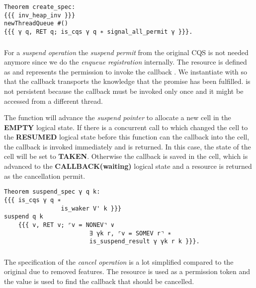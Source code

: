 \begin{verbatim}
Theorem create_spec:
{{{ inv_heap_inv }}}
newThreadQueue #()
{{{ γ q, RET q; is_cqs γ q ∗ signal_all_permit γ }}}.
\end{verbatim}

\subsubsection{}
\label{sec:cqs-spec-suspend}

For a \textit{suspend operation} the \textit{suspend permit} from the original CQS is not needed anymore since we do the \textit{enqueue registration} internally.
The  resource is defined as  and represents the permission to invoke the callback .
We instantiate  with  so that the callback transports the knowledge that the promise has been fulfilled.
 is not persistent because the callback must be invoked only once and it might be accessed from a different thread.

The  function will advance the \textit{suspend pointer} to allocate a new cell in the \textbf{EMPTY} logical state.
If there is a concurrent call to  which changed the cell to the \textbf{RESUMED} logical state before this function can  the callback into the cell, the callback is invoked immediately and  is returned.
In this case, the state of the cell will be set to \textbf{TAKEN}.
Otherwise the callback is saved in the cell, which is advanced to the \textbf{CALLBACK(waiting)} logical state and a  resource is returned as the cancellation permit.

\begin{verbatim}
Theorem suspend_spec γ q k:
{{{ is_cqs γ q ∗
                is_waker V' k }}}
suspend q k
    {{{ v, RET v; ⌜v = NONEV⌝ ∨
                        ∃ γk r, ⌜v = SOMEV r⌝ ∗
                        is_suspend_result γ γk r k }}}.
\end{verbatim}

\subsubsection{}
\label{sec:cqs-spec-cance}

The specification of the \textit{cancel operation} is a lot simplified compared to the original due to removed features.
The  resource is used as a permission token and the  value is used to find the callback that should be cancelled.

